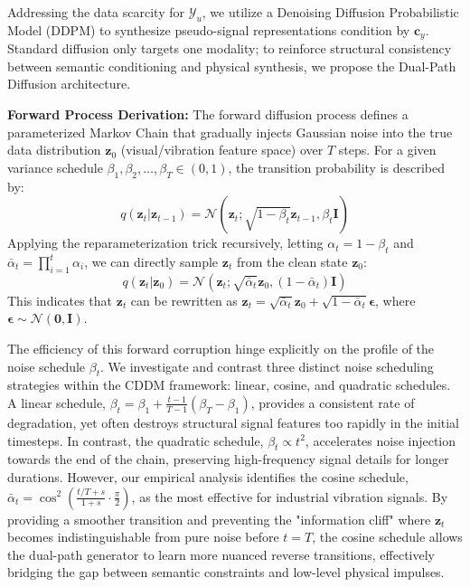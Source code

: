 Addressing the data scarcity for $\mathcal{Y}_u$, we utilize a Denoising Diffusion Probabilistic Model (DDPM) to synthesize pseudo-signal representations condition by $\mathbf{c}_y$. Standard diffusion only targets one modality; to reinforce structural consistency between semantic conditioning and physical synthesis, we propose the Dual-Path Diffusion architecture. 

\textbf{Forward Process Derivation:} The forward diffusion process defines a parameterized Markov Chain that gradually injects Gaussian noise into the true data distribution $\mathbf{z}_0$ (visual/vibration feature space) over $T$ steps. For a given variance schedule $\beta_1, \beta_2, \ldots, \beta_T \in (0,1)$, the transition probability is described by:
\begin{equation}\label{eq:forward_diffusion_step}
q(\mathbf{z}_t | \mathbf{z}_{t-1}) = \mathcal{N}(\mathbf{z}_t; \sqrt{1-\beta_t}\mathbf{z}_{t-1}, \beta_t \mathbf{I})
\end{equation}
Applying the reparameterization trick recursively, letting $\alpha_t = 1 - \beta_t$ and $\bar{\alpha}_t = \prod_{i=1}^t \alpha_i$, we can directly sample $\mathbf{z}_t$ from the clean state $\mathbf{z}_0$:
\begin{equation}\label{eq:forward_diffusion_direct}
q(\mathbf{z}_t | \mathbf{z}_0) = \mathcal{N}(\mathbf{z}_t; \sqrt{\bar{\alpha}_t}\mathbf{z}_0, (1 - \bar{\alpha}_t)\mathbf{I})
\end{equation}
This indicates that $\mathbf{z}_t$ can be rewritten as $\mathbf{z}_t = \sqrt{\bar{\alpha}_t}\mathbf{z}_0 + \sqrt{1 - \bar{\alpha}_t}\boldsymbol{\epsilon}$, where $\boldsymbol{\epsilon} \sim \mathcal{N}(\mathbf{0}, \mathbf{I})$.

The efficiency of this forward corruption hinge explicitly on the profile of the noise schedule $\beta_t$. We investigate and contrast three distinct noise scheduling strategies within the CDDM framework: linear, cosine, and quadratic schedules. A linear schedule, $\beta_t = \beta_1 + \frac{t-1}{T-1}(\beta_T - \beta_1)$, provides a consistent rate of degradation, yet often destroys structural signal features too rapidly in the initial timesteps. In contrast, the quadratic schedule, $\beta_t \propto t^2$, accelerates noise injection towards the end of the chain, preserving high-frequency signal details for longer durations. However, our empirical analysis identifies the cosine schedule, $\bar{\alpha}_t = \cos^2\left(\frac{t/T + s}{1+s} \cdot \frac{\pi}{2}\right)$, as the most effective for industrial vibration signals. By providing a smoother transition and preventing the "information cliff" where $\mathbf{z}_t$ becomes indistinguishable from pure noise before $t=T$, the cosine schedule allows the dual-path generator to learn more nuanced reverse transitions, effectively bridging the gap between semantic constraints and low-level physical impulses.


